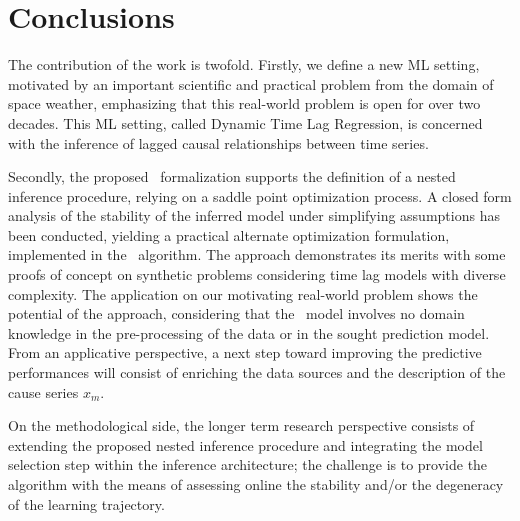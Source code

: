 \section{Conclusions}

The contribution of the work is twofold. Firstly, we define a new ML setting, motivated by an 
important scientific and practical problem from the domain of space weather, emphasizing that this 
real-world problem is open for over two decades. This ML setting, called 
Dynamic Time Lag Regression, is concerned with the inference of lagged causal relationships between 
time series. 

Secondly, the proposed \XX\ formalization supports the definition of a nested inference procedure, 
relying on a saddle point optimization process. A closed form analysis of the stability of the 
inferred model under simplifying assumptions has been conducted, yielding a practical alternate 
optimization formulation, implemented in the \XX\ algorithm. The approach demonstrates its merits 
with some proofs of concept on synthetic problems considering time lag models with diverse 
complexity. The application on our motivating real-world problem shows the potential of the 
approach, considering that the \XX\ model involves no domain knowledge in the pre-processing of the 
data or in the sought prediction model. From an applicative perspective, a next step toward 
improving the predictive performances will consist of enriching the data sources and the 
description of the cause series $x_m$.

On the methodological side, the longer term research perspective consists of extending the proposed 
nested inference procedure and integrating the model selection step within the inference 
architecture; the challenge is to provide the algorithm with the means of assessing online the 
stability and/or the degeneracy of the learning trajectory. 



%
%
